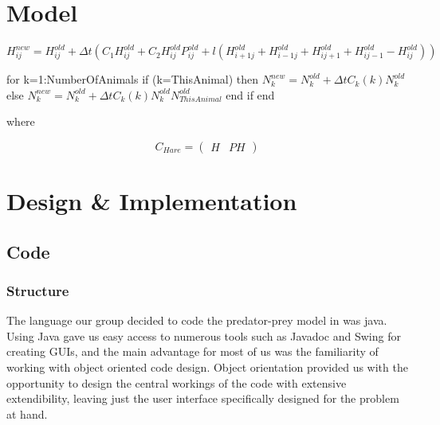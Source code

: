 \documentclass[11pt]{report}
\begin{document}
\chapter{Model} %

$H_{ij}^{new}=H_{ij}^{old} + {\Delta}t(C_{1}H_{ij}^{old}+C_{2}H_{ij}^{old}P_{ij}^{old} + l(H_{i+1j}^{old} + H_{i-1j}^{old} + H_{ij+1}^{old} + H_{ij-1}^{old}-H_{ij}^{old}))$


\vspace{30 mm}

\noindent for k=1:NumberOfAnimals\newline{}
if (k=ThisAnimal) then\newline{}
$N_{k}^{new}=N_{k}^{old} + {\Delta}tC_{k}(k)N_{k}^{old}$\newline{}
else\newline{}
$N_{k}^{new}=N_{k}^{old} + {\Delta}tC_{k}(k)N_{k}^{old}N_{ThisAnimal}^{old}$\newline{}
end if\newline{}
end

where

\[ C_{Hare} = \left( \begin{array}{cc}
H & PH \end{array} \right)\]    


\chapter{Design \& Implementation}
   \section{Code}
      \subsection{Structure} %
          The language our group decided to code the predator-prey model in was java. Using Java gave us easy access to numerous tools such as Javadoc and Swing for creating GUIs, and the main advantage for most of us was the familiarity of working with object oriented code design. Object orientation provided us with the opportunity to design the central workings of the code with extensive extendibility, leaving just the user interface specifically designed for the problem at hand.
\end{document}
